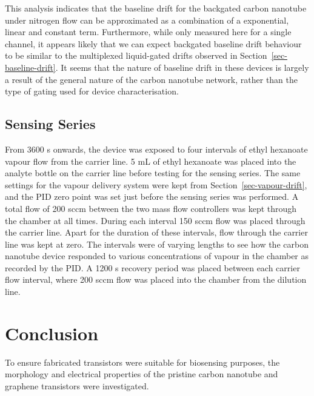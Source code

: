 \documentclass[
  a4paper,
]{scrbook}
\begin{document}
This analysis indicates that the baseline drift for the backgated carbon
nanotube under nitrogen flow can be approximated as a combination of a
exponential, linear and constant term. Furthermore, while only measured
here for a single channel, it appears likely that we can expect
backgated baseline drift behaviour to be similar to the multiplexed
liquid-gated drifts observed in Section~\ref{sec-baseline-drift}. It
seems that the nature of baseline drift in these devices is largely a
result of the general nature of the carbon nanotube network, rather than
the type of gating used for device characterisation.

\hypertarget{sec-EtHex-series}{%
\subsection{Sensing Series}\label{sec-EtHex-series}}

From 3600 s onwards, the device was exposed to four intervals of ethyl
hexanoate vapour flow from the carrier line. 5 mL of ethyl hexanoate was
placed into the analyte bottle on the carrier line before testing for
the sensing series. The same settings for the vapour delivery system
were kept from Section~\ref{sec-vapour-drift}, and the PID zero point
was set just before the sensing series was performed. A total flow of
200 sccm between the two mass flow controllers was kept through the
chamber at all times. During each interval 150 sccm flow was placed
through the carrier line. Apart for the duration of these intervals,
flow through the carrier line was kept at zero. The intervals were of
varying lengths to see how the carbon nanotube device responded to
various concentrations of vapour in the chamber as recorded by the PID.
A 1200 s recovery period was placed between each carrier flow interval,
where 200 sccm flow was placed into the chamber from the dilution line.

\hypertarget{conclusion}{%
\section{Conclusion}\label{conclusion}}

To ensure fabricated transistors were suitable for biosensing purposes,
the morphology and electrical properties of the pristine carbon nanotube
and graphene transistors were investigated.
\end{document}
